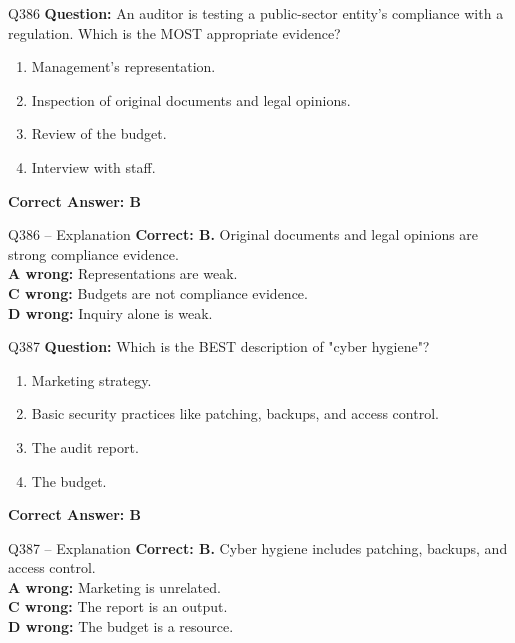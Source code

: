 \documentclass[aspectratio=169,10pt]{beamer}
\begin{document}
	\begin{frame}[t]{Q386}
		\small
		\textbf{Question:} An auditor is testing a public-sector entity's compliance with a regulation. Which is the MOST appropriate evidence?
		\begin{enumerate}[label=\Alph*.,itemsep=1pt,topsep=2pt]
			\item Management's representation.
			\item Inspection of original documents and legal opinions.
			\item Review of the budget.
			\item Interview with staff.
		\end{enumerate}
		\vspace{4pt}
		\textbf{Correct Answer: B}
	\end{frame}
	
	\begin{frame}[t]{Q386 -- Explanation}
		\small
		\textbf{Correct: B.} Original documents and legal opinions are strong compliance evidence. \\[4pt]
		\textbf{A wrong:} Representations are weak. \\[2pt]
		\textbf{C wrong:} Budgets are not compliance evidence. \\[2pt]
		\textbf{D wrong:} Inquiry alone is weak.
	\end{frame}
	
	\begin{frame}[t]{Q387}
		\small
		\textbf{Question:} Which is the BEST description of "cyber hygiene"?
		\begin{enumerate}[label=\Alph*.,itemsep=1pt,topsep=2pt]
			\item Marketing strategy.
			\item Basic security practices like patching, backups, and access control.
			\item The audit report.
			\item The budget.
		\end{enumerate}
		\vspace{4pt}
		\textbf{Correct Answer: B}
	\end{frame}
	
	\begin{frame}[t]{Q387 -- Explanation}
		\small
		\textbf{Correct: B.} Cyber hygiene includes patching, backups, and access control. \\[4pt]
		\textbf{A wrong:} Marketing is unrelated. \\[2pt]
		\textbf{C wrong:} The report is an output. \\[2pt]
		\textbf{D wrong:} The budget is a resource.
	\end{frame}
	
\end{document}

